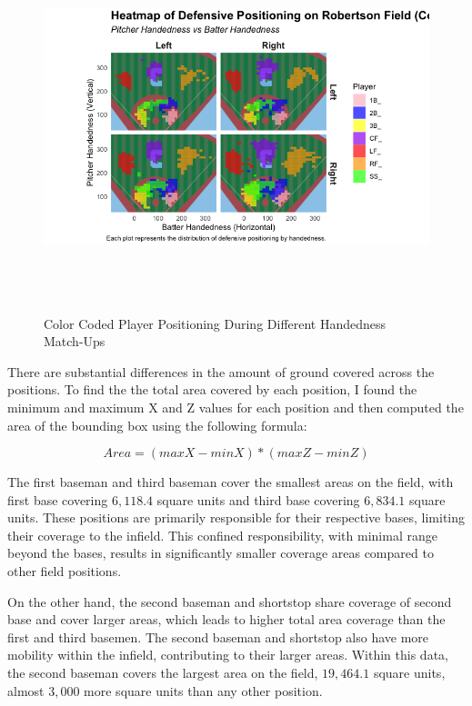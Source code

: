 \documentclass{article}
\begin{document}
\begin{figure}[h!]
    \begin{minipage}{\textwidth}
        \centering
        \includegraphics[height=10cm]{images/color_coded_handedness_heatmap.png}
        \caption{Color Coded Player Positioning During Different Handedness Match-Ups}
        \cite{trackman2022} \cite{trackman2023} \cite{trackman2024} \cite{albert2023analyzing}
    \end{minipage}
\end{figure}
\newpage


There are substantial differences in the amount of ground covered across the positions. To find the the total area covered by each position, I found the minimum and maximum X and Z values for each position and then computed the area of the bounding box using the following formula: 

$$Area = (max X-minX)*(maxZ-minZ)$$

The first baseman and third baseman cover the smallest areas on the field, with first base covering $6,118.4$ square units and third base covering $6,834.1$ square units. These positions are primarily responsible for their respective bases, limiting their coverage to the infield. This confined responsibility, with minimal range beyond the bases, results in significantly smaller coverage areas compared to other field positions. 

On the other hand, the second baseman and shortstop share coverage of second base and cover larger areas, which leads to higher total area coverage than the first and third basemen. The second baseman and shortstop also have more mobility within the infield, contributing to their larger areas. Within this data, the second baseman covers the largest area on the field, $19,464.1$ square units, almost $3,000$ more square units than any other position. 
\end{document}
